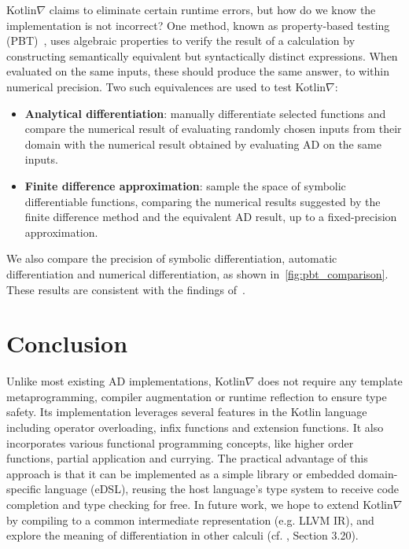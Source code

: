 \documentclass{article}
\begin{document}
Kotlin$\nabla$ claims to eliminate certain runtime errors, but how do we know the implementation is not incorrect? One method, known as property-based testing (PBT)~\citep{fink1997property}, uses algebraic properties to verify the result of a calculation by constructing semantically equivalent but syntactically distinct expressions. When evaluated on the same inputs, these should produce the same answer, to within numerical precision. Two such equivalences are used to test Kotlin$\nabla$: \\
%
\begin{itemize}
    \item \textbf{Analytical differentiation}: manually differentiate selected functions and compare the numerical result of evaluating randomly chosen inputs from their domain with the numerical result obtained by evaluating AD on the same inputs.
    \item \textbf{Finite difference approximation}: sample the space of symbolic differentiable functions, comparing the numerical results suggested by the finite difference method and the equivalent AD result, up to a fixed-precision approximation. \\
\end{itemize}

We also compare the precision of symbolic differentiation, automatic differentiation and numerical differentiation, as shown in~\autoref{fig:pbt_comparison}. These results are consistent with the findings of~\citet{laue2019equivalence}.

\section{Conclusion}

Unlike most existing AD implementations, Kotlin$\nabla$ does not require any template metaprogramming, compiler augmentation or runtime reflection to ensure type safety. Its implementation leverages several features in the Kotlin language including operator overloading, infix functions and extension functions. It also incorporates various functional programming concepts, like higher order functions, partial application and currying. The practical advantage of this approach is that it can be implemented as a simple library or embedded domain-specific language (eDSL), reusing the host language's type system to receive code completion and type checking for free. In future work, we hope to extend Kotlin$\nabla$ by compiling to a common intermediate representation (e.g. LLVM IR), and explore the meaning of differentiation in other calculi (cf. \citet{considine2019programming}, Section 3.20).



\end{document}
